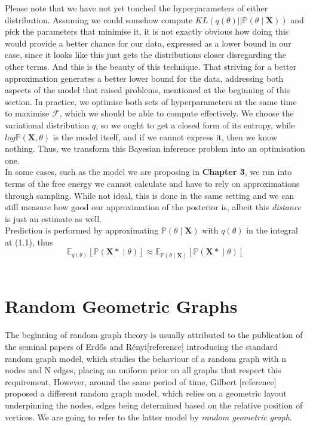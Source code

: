 \documentclass[12pt]{report}
\newcommand{\bs}{\boldsymbol}
\newcommand{\mc}[1]{\mathcal{#1}}
\newcommand{\E}{\mathbb{E}}
\renewcommand{\P}{\mathbb{P}}
\renewcommand{\bs}{\boldsymbol}
\begin{document}
\noindent
Please note that we have not yet touched the hyperparameters of either distribution. Assuming we could somehow compute $KL(q(\theta) || \P(\theta \mid \bs{X}))$ and pick the parameters that minimise it, it is not exactly obvious how doing this would provide a better chance for our data, expressed as a lower bound in our case, since it looks like this just gets the distributions closer disregarding the other terms. And this is the beauty of this technique. That striving for a better approximation generates a better lower bound for the data, addressing both aspects of the model that raised problems, mentioned at the beginning of this section. In practice, we optimise both sets of hyperparameters at the same time to maximise $\mc{F}$, which we should be able to compute effectively. We choose the variational distribution $q$, so we ought to get a closed form of its entropy, while $log \P(\bs{X}, \theta)$ is the model itself, and if we cannot express it, then we know nothing. Thus, we transform this Bayesian inference problem into an optimisation one. \\

\noindent
In some cases, such as the model we are proposing in \textbf{Chapter 3}, we run into terms of the free energy we cannot calculate and have to rely on approximations through sampling. While not ideal, this is done in the same setting and we can still measure how good our approximation of the posterior is, albeit this \textit{distance} is just an estimate as well. \\

\noindent
Prediction is performed by approximating $\P(\theta \mid \bs{X})$ with $q(\theta)$ in the integral at (1.1), thus
\begin{equation}
    \E_{q(\theta)}[\P(\bs{X*} \mid \theta)] \approx \E_{\P(\theta \mid \bs{X})}[\P(\bs{X*} \mid \theta)]
\end{equation} \\

\section{Random Geometric Graphs}
The beginning of random graph theory is usually attributed to the publication of the seminal papers of Erd\H{o}s and R\'{e}nyi[reference] introducing the standard random graph model, which studies the behaviour of a random graph with n nodes and N edges, placing an uniform prior on all graphs that respect this requirement. However, around the same period of time, Gilbert [reference] proposed a different random graph model, which relies on a geometric layout underpinning the nodes, edges being determined based on the relative position of vertices. We are going to refer to the latter model by \textit{random geometric graph}. \\
\end{document}

